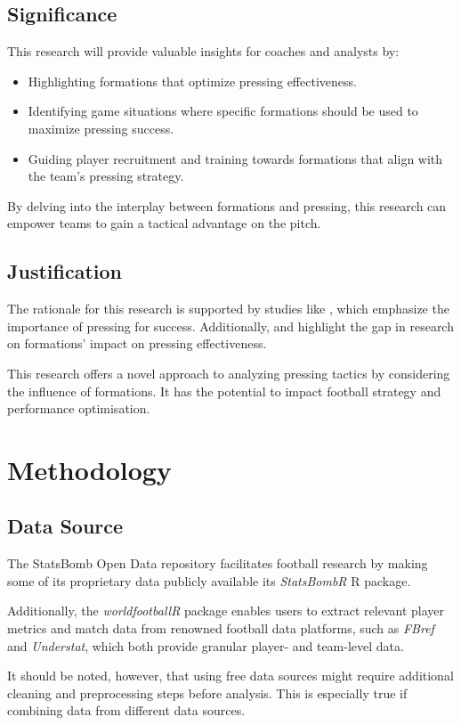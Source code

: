 \documentclass[12pt]{article}
\begin{document}
\subsection{Significance}
This research will provide valuable insights for coaches and analysts by:
\begin{itemize}
    \item Highlighting formations that optimize pressing effectiveness.
    \item Identifying game situations where specific formations should be used to maximize pressing success.
    \item Guiding player recruitment and training towards formations that align with the team's pressing strategy.
\end{itemize}
By delving into the interplay between formations and pressing, this research can empower teams to gain a tactical advantage on the pitch.

\subsection{Justification}
The rationale for this research is supported by studies like \cite{modric2023influence}, which emphasize the importance of pressing for success. Additionally, \cite{rico2023machine} and \cite{goes2021unlocking} highlight the gap in research on formations' impact on pressing effectiveness.

This research offers a novel approach to analyzing pressing tactics by considering the influence of formations. It has the potential to impact football strategy and performance optimisation.

\section{Methodology}
\subsection{Data Source}
The StatsBomb Open Data repository facilitates football research by making some of its proprietary data publicly available its \textit{StatsBombR} R package. 

Additionally, the \textit{worldfootballR} package enables users to extract relevant player metrics and match data from renowned football data platforms, such as \textit{FBref} and \textit{Understat}, which both provide granular player- and team-level data. 

It should be noted, however, that using free data sources might require additional cleaning and preprocessing steps before analysis. This is especially true if combining data from different data sources.
\end{document}
